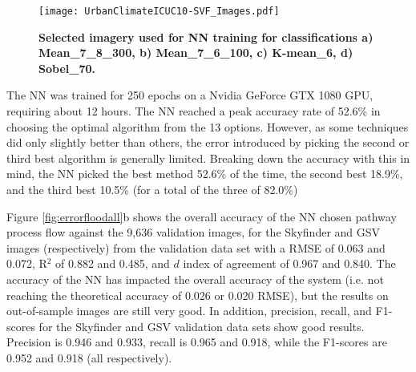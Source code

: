 \documentclass[final,3p,times,authoryear]{elsarticle}
\begin{document}
\begin{figure}
\centering
\texttt{[image: UrbanClimateICUC10-SVF\_Images.pdf]} 
\caption{\textbf{Selected imagery used for NN training for classifications 
a) Mean\_7\_8\_300, b) Mean\_7\_6\_100, c) K-mean\_6, d) Sobel\_70.}}
\label{fig:classImages}
\end{figure}

The NN was trained for 250 epochs on a Nvidia GeForce GTX 1080 GPU, requiring about 12 hours. The NN reached a peak accuracy rate of 52.6\% in choosing the optimal algorithm from the 13 options. However, as some techniques did only slightly better than others, the error introduced by picking the second or third best algorithm is generally limited. Breaking down the accuracy with this in mind, the NN picked the best method 52.6\% of the time, the second best 18.9\%, and the third best 10.5\% (for a total of the three of 82.0\%)

Figure \ref{fig:errorfloodall}b shows the overall accuracy of the NN chosen pathway process flow against the 9,636 validation images, for the Skyfinder and GSV images (respectively) from the validation data set with a RMSE of 0.063 and 0.072, R$^{2}$ of 0.882 and 0.485, and $d$ index of agreement of 0.967 and 0.840. The accuracy of the NN has impacted the overall accuracy of the system (i.e. not reaching the theoretical accuracy of 0.026 or 0.020 RMSE), but the results on out-of-sample images are still very good. In addition, precision, recall, and F1-scores for the Skyfinder and GSV validation data sets show good results. Precision is 0.946 and 0.933, recall is 0.965 and 0.918, while the F1-scores are 0.952 and 0.918 (all respectively).





\end{document}
